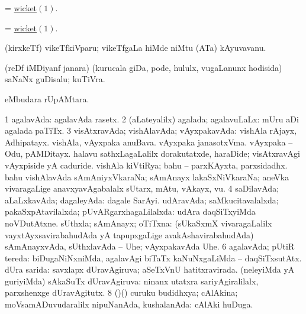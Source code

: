 \bentry 
{}
\gl{\nA}
\bmng
= \hyperlink{wicket}{wicket\((1)\)}. 
\emng
\eentry

\bentry
{}
\gl{\nA}
\bmng
= \hyperlink{wicket}{wicket\((1)\)}. 
\emng
\eentry

\bentry
{}
\gl{\nA}
\bmng
(kirxkeTf) vikeTfkiVparu; vikeTfgaLa hiMde niMtu (ATa) kAyuvavanu. 
\emng
\eentry

\bentry
{}
\gl{\nA}
\bmng
(reDf iMDiyanf janara) (kurucala giDa, pode, hululx, \mo vugaLanunx hodisida) saNaNx guDisalu; kuTiVra.  
\emng
\eentry

\bentry
{}
\gl{\kirxvi}
\bmng
{} eMbudara rUpAMtara. 
\emng
\eentry

\bentry
{} 
\gl{\gu}
\expl{}
\bmng
\bnum
\num{1} agalavAda:  agalavAda rasetx. 
\num{2} (aLateyalilx) agalada; agalavuLaLx:  mUru aDi agalada paTiTx. 
\num{3} visAtxravAda; vishAlavAda; vAyxpakavAda:  vishAla rAjayx, Adhipatayx.  vishAla, vAyxpaka anuBava.  vAyxpaka janasotxVma.  vAyxpaka -- Odu, pAMDitayx.  halavu sathxLagaLalilx dorakutatxde, haraDide; visAtxravAgi vAyxpiside yA caduride.  vishAla kiVtiRya; bahu -- parxKAyxta, parxsidadhx.  bahu vishAlavAda sAmAniyxVkaraNa; sAmAnayx lakaSxNiVkaraNa; aneVka vivaragaLige anavxyavAgabalalx sUtarx, mAtu, vAkayx, \mo vu. 
\num{4} saDilavAda; aLaLxkavAda; dagaleyAda:  dagale SarAyi. 
\banum
{} udAravAda; saMkucitavalalxda; pakaSxpAtavilalxda; pUvARgarxhagaLilalxda:  udAra daqSiTxyiMda noVDutAtxne. 
 sUthxla; sAmAnayx; oTiTxna:  (sUkaSxmX vivaragaLalilx vayxtAyxsavirabahudAda yA tapupxgaLige avakAshavirabahudAda) sAmAnayxvAda, sUthxlavAda -- Uhe; vAyxpakavAda Uhe. 
\eanum
\numie
\num{6} agalavAda; pUtiR tereda:  biDugaNiNxniMda, agalavAgi biTaTx kaNuNxgaLiMda -- daqSiTxsutAtx. 
 dUra sarida: 
\banum
{} savxlapx dUravAgiruva; aSeTxVnU hatitxravirada. 
 (neleyiMda yA guriyiMda) sAkaSuTx dUravAgiruva:  ninanx utatxra sariyAgiralilalx, parxshenxge dUravAgitutx. 
\eanum
\numie
\num{8} (\birx)(\ashi) curuku budidhxya; cAlAkina; moVsamADuvudaralilx nipuNanAda, kushalanAda:  cAlAki huDuga. 
\enum
\emng

